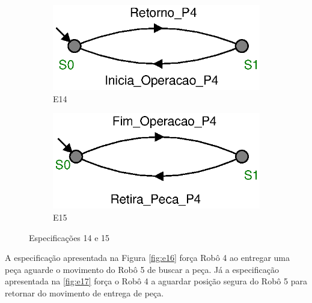 \begin{figure}[H]%
  \centering
  \begin{subfigure}{0.45\textwidth}
      \centering
      \includegraphics[width=\textwidth]{imagens/E14.eps}
      \caption{E14}
      \label{fig:e14}
  \end{subfigure}
  \hfill
  \begin{subfigure}{0.45\textwidth}
      \centering
      \includegraphics[width=\textwidth]{imagens/E15.eps}
      \caption{E15}
      \label{fig:e15}
  \end{subfigure}
  \caption{Especificações 14 e 15}
  \label{fig:e1415}
\end{figure}

A especificação apresentada na Figura \ref{fig:e16} força Robô 4 ao entregar uma peça aguarde o movimento do Robô 5 de buscar a peça.
Já a especificação apresentada na \ref{fig:e17} força o Robô 4 a aguardar posição segura do Robô 5 para retornar do movimento de entrega de peça.

